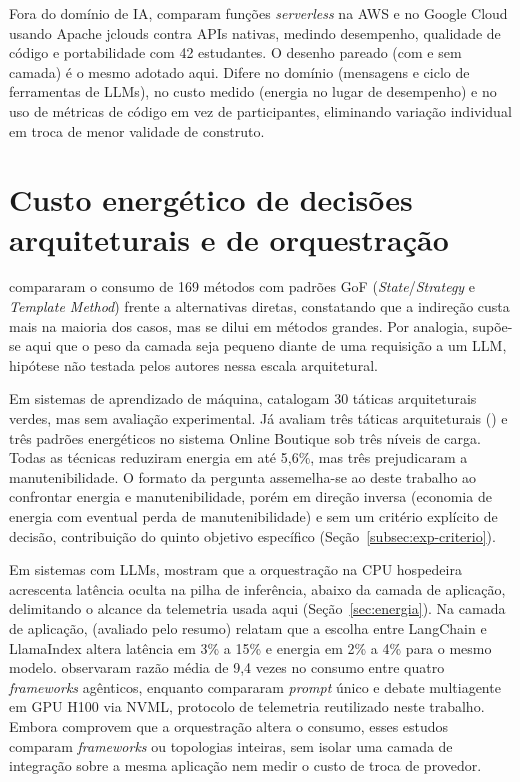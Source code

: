 Fora do domínio de IA,  comparam funções \textit{serverless}
na AWS e no Google Cloud usando Apache jclouds contra APIs nativas,
medindo desempenho, qualidade de código e portabilidade com 42 estudantes. O
desenho pareado (com e sem camada) é o mesmo adotado aqui. Difere no domínio
(mensagens e ciclo de ferramentas de LLMs), no custo medido (energia no lugar de
desempenho) e no uso de métricas de código em vez de participantes, eliminando
variação individual em troca de menor validade de construto.

\section{Custo energético de decisões arquiteturais e de orquestração}
\label{sec:tr-energia}

 compararam o consumo de 169 métodos com padrões GoF
(\textit{State}/\allowbreak\textit{Strategy} e \textit{Template Method}) frente
a alternativas diretas, constatando que a indireção custa mais na maioria dos
casos, mas se dilui em métodos grandes. Por analogia, supõe-se aqui que o peso
da camada seja pequeno diante de uma requisição a um LLM, hipótese não testada
pelos autores nessa escala arquitetural.

Em sistemas de aprendizado de máquina,  catalogam 30
táticas arquiteturais verdes, mas sem avaliação experimental. Já
 avaliam três táticas arquiteturais (\cite{bass2021}) e
três padrões energéticos no sistema Online Boutique sob três níveis de carga.
Todas as técnicas reduziram energia em até 5,6\%, mas três prejudicaram a
manutenibilidade. O formato da pergunta assemelha-se ao deste trabalho ao
confrontar energia e manutenibilidade, porém em direção inversa (economia de
energia com eventual perda de manutenibilidade) e sem um critério explícito de
decisão, contribuição do quinto objetivo específico
(Seção~\ref{subsec:exp-criterio}).

Em sistemas com LLMs,  mostram que a orquestração na
CPU hospedeira acrescenta latência oculta na pilha de inferência, abaixo da
camada de aplicação, delimitando o alcance da telemetria usada aqui
(Seção~\ref{sec:energia}). Na camada de aplicação, 
(avaliado pelo resumo) relatam que a escolha entre LangChain e LlamaIndex altera
latência em 3\% a 15\% e energia em 2\% a 4\% para o mesmo modelo.
 observaram razão média de 9,4 vezes no consumo entre
quatro \textit{frameworks} agênticos, enquanto 
compararam \textit{prompt} único e debate multiagente em GPU H100 via NVML,
protocolo de telemetria reutilizado neste trabalho. Embora comprovem que a
orquestração altera o consumo, esses estudos comparam \textit{frameworks} ou
topologias inteiras, sem isolar uma camada de integração sobre a mesma
aplicação nem medir o custo de troca de provedor.

